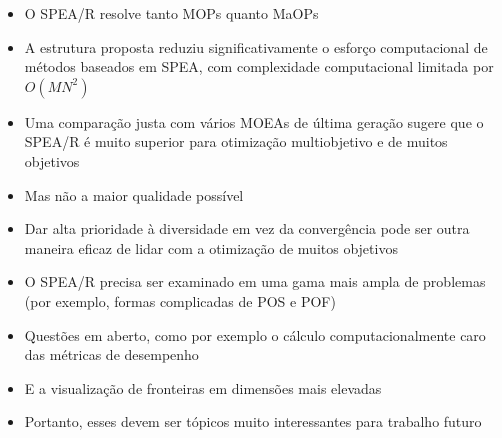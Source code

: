 \documentclass{rbfin}
\begin{document}
\begin{itemize}
  \item O SPEA/R resolve tanto MOPs quanto MaOPs
  \item A estrutura proposta reduziu significativamente o esforço computacional de métodos baseados em SPEA, com complexidade computacional limitada por $O(MN^2)$
  \item Uma comparação justa com vários MOEAs de última geração sugere que o SPEA/R é muito superior para otimização multiobjetivo e de muitos objetivos
  \item Mas não a maior qualidade possível 
  \item Dar alta prioridade à diversidade em vez da convergência pode ser outra maneira eficaz de lidar com a otimização de muitos objetivos
  \item O SPEA/R precisa ser examinado em uma gama mais ampla de problemas (por exemplo, formas complicadas de POS e POF)
  \item Questões em aberto, como por exemplo o cálculo computacionalmente caro das métricas de desempenho
  \item E a visualização de fronteiras em dimensões mais elevadas
  \item Portanto, esses devem ser tópicos muito interessantes para trabalho futuro
\end{itemize}
\end{document}
